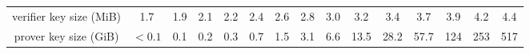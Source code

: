 \begin{table}[H]
{\begin{tabular}{ccccccccccccccc}
verifier key size (MiB)                    & 1.7                                & 1.9                                & 2.1                                & 2.2                               & 2.4                               & 2.6                               & 2.8                               & 3.0                                & 3.2                                & 3.4                                & 3.7                                 & 3.9                                 & 4.2                                 & 4.4                                 \\
prover key size (GiB)                      & $<0.1$                             & 0.1                                & 0.2                                & 0.3                               & 0.7                               & 1.5                               & 3.1                               & 6.6                                & 13.5                               & 28.2                               & 57.7                                & 124                                 & 253                                 & 517                                 \\ \hline
\end{tabular}
}
\end{table}


